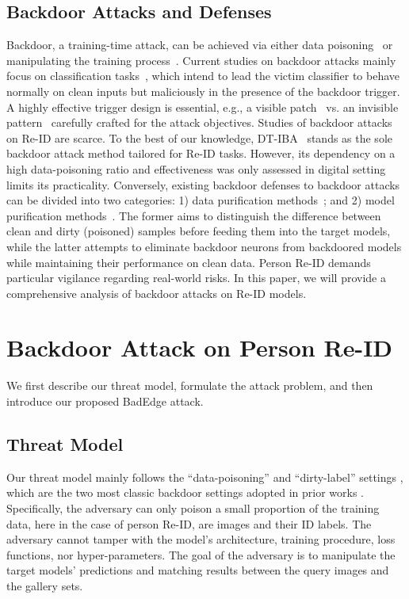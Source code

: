 \documentclass[sigconf,authordraft]{acmart}
\begin{document}
\subsection{Backdoor Attacks and Defenses}
Backdoor, a training-time attack, can be achieved via either data poisoning~\cite{Gu2017BadNetsIV,liu2018trojaning,chen2017targeted} or manipulating the training process~\cite{bagdasaryan2021blind,nguyen2021wanet}.
Current studies on backdoor attacks mainly focus on classification tasks~\cite{Gu2017BadNetsIV,chen2017targeted,zhang2022poison}, which intend to lead the victim classifier to behave normally on clean inputs but maliciously in the presence of the backdoor trigger. A highly effective trigger design is essential, e.g., a visible patch~\cite{Gu2017BadNetsIV,liu2018trojaning} vs. an invisible pattern~\cite{liu2020reflection,li2020invisible,barni2019new} carefully crafted for the attack objectives. Studies of backdoor attacks on Re-ID are scarce. To the best of our knowledge, DT-IBA~\cite{sun2022invisible} stands as the sole backdoor attack method tailored for Re-ID tasks. However, its dependency on a high data-poisoning ratio and effectiveness was only assessed in digital setting limits its practicality.
Conversely, existing backdoor defenses to backdoor attacks can be divided into two categories: 1) data purification methods~\cite {qiu2021deepsweep,du2019robust,zeng2021rethinking}; and 2) model purification methods~\cite{dhillon2018stochastic,liu2018fine,li2021anti,wu2021adversarial}. The former aims to distinguish the difference between clean and dirty (poisoned) samples before feeding them into the target models, while the latter attempts to eliminate backdoor neurons from backdoored models while maintaining their performance on clean data.
Person Re-ID demands particular vigilance regarding real-world risks. In this paper, we will provide a comprehensive analysis of backdoor attacks on Re-ID models.

\section{Backdoor Attack on Person Re-ID}
\label{sec:method}

We first describe our threat model, formulate the attack problem, and then introduce our proposed BadEdge attack.

\subsection{Threat Model}
Our threat model mainly follows the ``data-poisoning”  and ``dirty-label”  settings , which are the two most classic backdoor settings adopted in prior works \cite{Gu2017BadNetsIV,liu2020reflection}.
Specifically, the adversary can only poison a small proportion of the training data, here in the case of person Re-ID, are images and their ID labels. The adversary cannot tamper with the model's architecture, training procedure, loss functions, nor hyper-parameters. The goal of the adversary is to manipulate the target models' predictions and matching results between the query images and the gallery sets.
\end{document}
